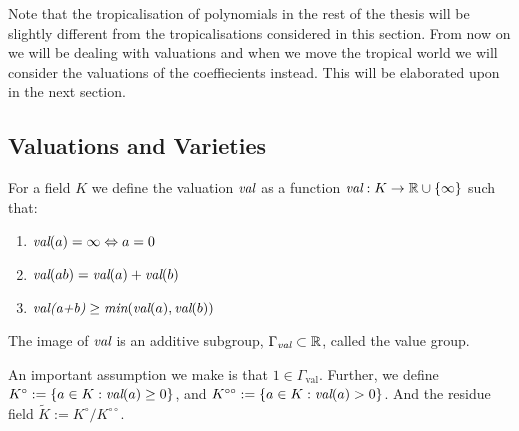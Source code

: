 \begin{remark}
    \label{rmkOnTropPol}
    Note that the tropicalisation of polynomials in the rest of the thesis will be slightly different from the tropicalisations considered in this section.
    From now on we will be dealing with valuations and when we move the tropical world we will consider the valuations of the coeffiecients instead. 
    This will be elaborated upon in the next section.
\end{remark}

\subsection{Valuations and Varieties}
    \begin{definition}
        For a field $K$ we define the valuation $\emph{val}$ as a function $\emph{val}: K \to \mathbb{R}\cup \{\infty\}$ such that:
        \begin{enumerate}
            \item $\emph{val}(a) = \infty \Leftrightarrow a = 0$
            \item $\emph{val}(ab) = \emph{val}(a)+ \emph{val}(b)$
            \item $\emph{val(a+b)} \geq \emph{min}(\emph{val}(a),\emph{val}(b))$
        \end{enumerate}
        The image of $\emph{val}$ is an additive subgroup, $\Gamma_{\emph{val}} \subset \mathbb{R}$, called the value group.
        \par An important assumption we make is that $1 \in \Gamma_{\text{val}}$. 
    Further, we define $K^{\circ} := \{a \in K: \emph{val}(a)\geq 0\}$, and $K^{\circ \circ} := \{a \in K: \emph{val}(a)> 0\}$. 
    And the residue field $\tilde{K} := K^{\circ}/K^{\circ \circ}$.
    \end{definition}

